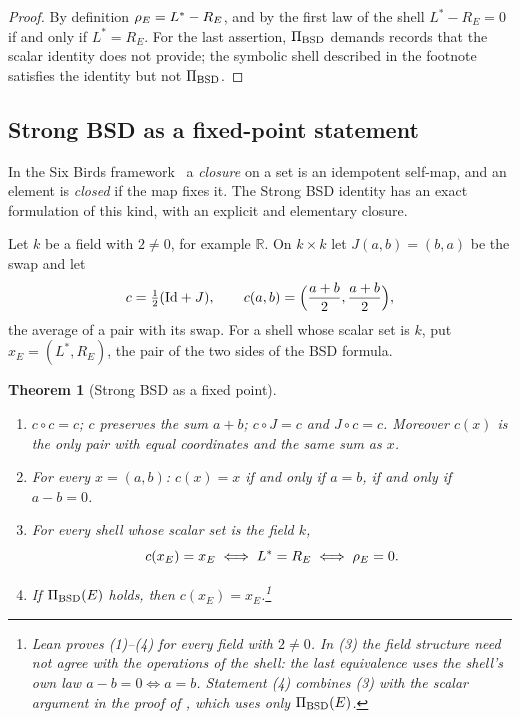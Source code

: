 \documentclass[11pt]{article}
\newtheorem{theorem}{Theorem}[section]
\theoremstyle{definition}
\newcommand{\R}{\mathbb{R}}
\begin{document}
\begin{proof}
By definition $\rho_E=L^*-R_E$, and by the first law of the shell
$L^*-R_E=0$ if and only if $L^*=R_E$.  For the last assertion,
$\Pi_{\mathrm{BSD}}$ demands records that the scalar identity does not provide; the
symbolic shell described in the footnote satisfies the identity but not
$\Pi_{\mathrm{BSD}}$.
\end{proof}

\subsection{Strong BSD as a fixed-point statement}
\label{sec:scalar-closure}

In the Six Birds framework~\citep{TsiokosFoundationsIII2026} a
\emph{closure} on a set is an idempotent self-map, and an element is
\emph{closed} if the map fixes it.  The Strong BSD identity has an exact
formulation of this kind, with an explicit and elementary closure.

Let $k$ be a field with $2\neq0$, for example $\R$.  On $k\times k$ let
$J(a,b)=(b,a)$ be the swap and let
\[
  c=\tfrac12(\mathrm{Id}+J),\qquad c(a,b)=\Bigl(\frac{a+b}{2},\frac{a+b}{2}\Bigr),
\]
the average of a pair with its swap.  For a shell whose scalar set is
$k$, put $x_E=(L^*,R_E)$, the pair of the two sides of the BSD formula.

\begin{theorem}[Strong BSD as a fixed point]\label{thm:closure:scalar-closure-translation}
\leavevmode
\begin{enumerate}
\item $c\circ c=c$; $c$ preserves the sum $a+b$; $c\circ J=c$ and
  $J\circ c=c$.  Moreover $c(x)$ is the only pair with equal coordinates
  and the same sum as $x$.
\item For every $x=(a,b)$: $c(x)=x$ if and only if $a=b$, if and only if
  $a-b=0$.
\item For every shell whose scalar set is the field $k$,
  \[
    c(x_E)=x_E
    \iff
    L^*=R_E
    \iff
    \rho_E=0 .
  \]
\item If $\Pi_{\mathrm{BSD}}(E)$ holds, then $c(x_E)=x_E$.\footnote{Lean proves (1)--(4) for every field with $2\neq0$.  In (3) the
field structure need not agree with the operations of the shell: the
last equivalence uses the shell's own law $a-b=0\iff a=b$.  Statement (4)
combines (3) with the scalar argument in the proof of
, which uses only $\Pi_{\mathrm{BSD}}(E)$.}
\end{enumerate}
\end{theorem}
\end{document}
